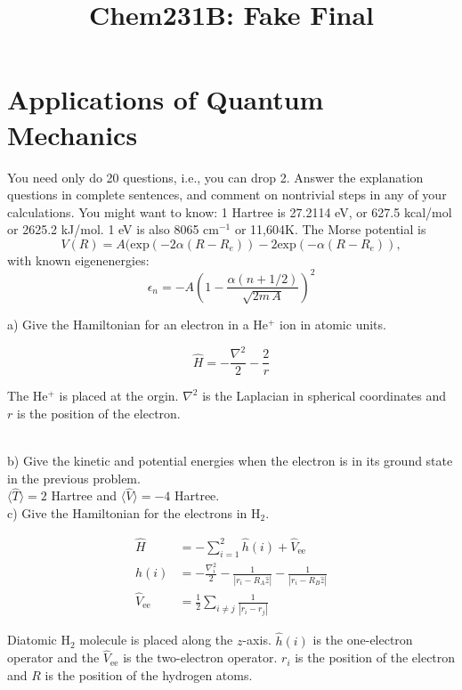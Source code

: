 \documentclass{article}
\title{Chem231B: Fake Final} %
\begin{document}
\maketitle

\section*{Applications of Quantum Mechanics}

You need only do 20 questions, i.e., you can drop 2. Answer the explanation questions in complete
sentences, and comment on nontrivial steps in any of your calculations. You might want to know:
1 Hartree is 27.2114 eV, or 627.5 kcal/mol or 2625.2 kJ/mol. 1 eV is also 8065 cm$^{-1}$ or 11,604K.
The Morse potential is
\begin{equation}
  V(R) = A(\text{exp}(-2\alpha(R-R_e))-2\text{exp}(-\alpha(R-R_e)),
\end{equation}
with known eigenenergies:
\begin{equation}
  \epsilon_n = -A(1 - \frac{\alpha(n+1/2)}{\sqrt{2m\,A}})^2
\end{equation}

\noindent a) Give the Hamiltonian for an electron in a He$^+$ ion in atomic units.

{\color{blue}
  \begin{equation*}
    \hat{H} = -\frac{\nabla^2}{2} - \frac{2}{r}
  \end{equation*}

  The He$^+$ is placed at the orgin. $\nabla^2$ is the Laplacian in spherical coordinates and
  $r$ is the position of the electron.
}
\\

\noindent b) Give the kinetic and potential energies when the electron is in its ground state
in the previous problem.
\\

{\color{blue} $\langle \hat{T} \rangle = 2$ Hartree and $\langle \hat{V} \rangle = -4$ Hartree.}
\\

\noindent c) Give the Hamiltonian for the electrons in H$_2$.

{\color{blue}
  \begin{align*}
    \hat{H} & = -\sum_{i=1}^2\hat{h}(i) + \hat{V}_{\text{ee}} \\
    \hat{h}(i) & = -\frac{\nabla_i^2}{2} - \frac{1}{|r_i-R_A\hat{z}|} -\frac{1}{|r_i - R_B\hat{z}|} \\
    \hat{V}_{\text{ee}} & = \frac{1}{2}\sum_{i\neq j} \frac{1}{|r_i-r_j|}
  \end{align*}

  Diatomic H$_2$ molecule is placed along the $z$-axis. $\hat{h}(i)$ is the one-electron
  operator and the $\hat{V}_{\text{ee}}$ is the two-electron operator. $r_i$ is the position
  of the electron and $R$ is the position of the hydrogen atoms.
}
\\
\end{document}
